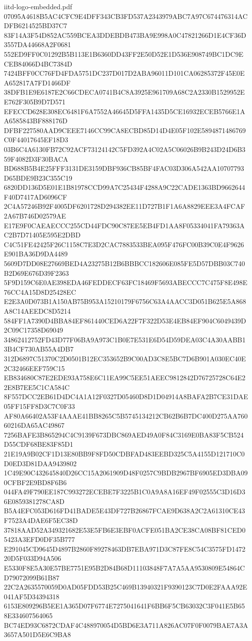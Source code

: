 \begin{filecontents*}[overwrite]{iitd-logo-embedded.pdf}
07095A4618B5AC4CFC9E4DFF343CB3FD537A2343979ABC7A97C674476314ACDFB6214525BD37C7
83F14A3F54D852AC559BCEA3DDEBDB473BA9E998A0C47821266D1E4CF36D3557DA44668A2F0681
552ED9FF0C01292B5B113E1B6360DD43FF2E50D52E1D536E908749BC1DC9ECEB84066D4BC7384D
7424BFF0CC76FD4FDA5751DC237D017D2ABA96011D101CA06285372F45E0EA652817A7FD1466DF
38DFB1E9E6187E2C66CDECA0741B4C8A3925E961709A68C2A2330B1529952EE762F305B9D7D571
EFECCD628E308EC6481F6A7552A46645D5FFA1435D5CE16932ECEB5766E1AA6585843BF888176D
DFBF227580AAD9CEEE7146CC99CA8ECBD85D14D4E05F102E5894871486769C0F44017645EF18D3
03B6C4A6130FB72C92ACF73124142C5FD392A4C02A5C06026B9B243D24D6B359F4082D3F30BACA
BD688B5B4E25FFF3131DE3159DBF936CB85BF4FAC03D306A542AA10707793D65BDE9B23C355C19
6820DD136D5E01E1B81978CCD99A7C25434F4288A9C22CADE1363BD9662644F40D7417AD6096CF
2C4A57246B92F4005DF6201728D294382EE11D727B1F1A6A8829EEE3A4FCAF2A67B746D02579AE
E17E9F0CAEAECCC255CD44FDC90C87EE5EB4FD1AA8F05334041FA79363AC2B7D71405E595E2DBD
C4C51FE42425F26C1158C7E3D2CAC7883533BEA095F476FC00B39C0E4F9626E901BA36D9DA4489
5609D7DD08E27669BED4A23275B12B6BBBCC182606E085FE5D57DBB03C740B2D69E676D39F2363
5F9D159C6E0AE398EDA46FEDDECF63FC18469F5693ABECCC7C475F8E498E76CC4A15D8D25428EC
E2E3A0D073B1A150AB75B953A15210179F6756C63A4AACC3D051B625E5A868A8C14AEEDC8D5214
584FF1A7390D4BBA84EF861440CED6A22F7F322D53E4EB84EF904C6049439D2C09C17358D69049
34862412752FD43D77F06BA9A973C1B0E7E531E6D54D59DEA03C4A30AABB13B4CF730AB55A4DB7
312D6897C51370C2D0501B12EC353652B9C00AD3C8E5BC7D6B901A030EC40E2C32466EEF759C15
EB834680C87E2EDE93A758E6C11EA99C5EE51AEEC9812842D76725728C64E22E8B7EE5C1CA584C
8F557DCC2EB61D4DC4A1A12F0327D05460D8D1D04914A8BAFA2B7CE31DAE05FF15FF8D3C7C0F33
AF80A66402A53F4AAAE41BB8265C5B5745134212CB62B6B7DC400D275AA76060216DA65AC49867
7256BAFE3B865294C4C9139F673DBC869AED49A0F84C3169E0BA83F5CB524D55CDF68BE83F85D1
21E19A9B02CF1D13E80BB9F8FD50CDBFAD483EEBD325C5A4155D121710C0D0ED3D81DAA9439802
1C49E90C432645840D26CC15A2061909D48F0257C9BDB2967BF6905ED3DBA090CFBF2E9BD8F6B6
044FA49F790EE187C993272ECEBE7F3225B1C0A9A8A16EF49F02555C3D16D36E0859381278CA8D
B5A4EFC053D616FD41BADE5E43DF727B26867FCAE9D638A2C2A61310CE43F7523A4DAE6F5EC38D
37818AAD52A349321682E53E5FB6E3EBF0ACFE051BA2CE38CA08BF81CED05423A3EFD0DF35B777
E291045CD9645D4897B2860F89278463DB7EBA971D3C87FE8C54C3575FD147220D5F033D94A506
E5330F8E5A30E57BE7751E95B2D84B68D11103848F7A7A5AA9530809E54864CD79072099B61B87
22C2A2635570059D0AD05FDD53B25C469B13940321F9390123C7D0E2FAAA92E041AF5D34394318
6153E809296B5EE1A365D07F6774E7275041641F6BB6F5CB63032C3F041E5B658E334607564065
BC74ED93C6872CDAF4C488970054D5BD6E3A711A826AC07F0F0079BAE7A3A3657A501D5E6C9BA8

\end{filecontents*}
